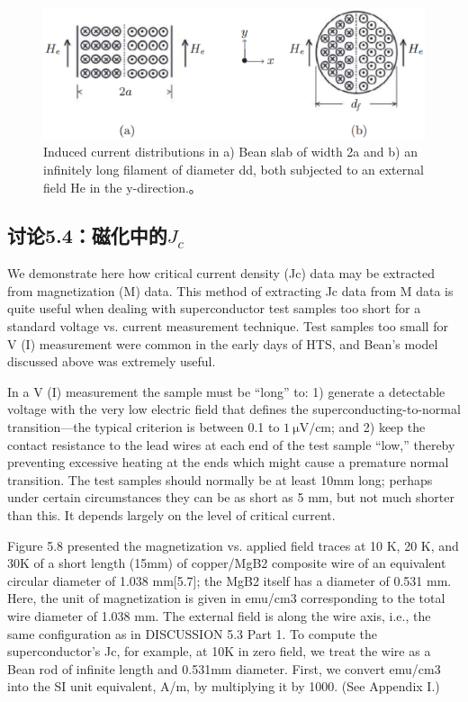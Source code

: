 \begin{figure}[htbp]
	\centering
	\includegraphics[scale=0.5]{chpt5/figs/fig5.16.eps}
	\caption{Induced current distributions in a) Bean slab of width 2a and b) an infinitely
		long filament of diameter dd, both subjected to an external field He in the y-direction.。}
\end{figure}

\subsection{讨论5.4：磁化中的$J_c$}
We demonstrate here how critical current density (Jc) data may be extracted
from magnetization (M) data. This method of extracting Jc data from M data
is quite useful when dealing with superconductor test samples too short for a
standard voltage vs. current measurement technique. Test samples too small for
V (I) measurement were common in the early days of HTS, and Bean’s model
discussed above was extremely useful.

In a V (I) measurement the sample must be “long” to: 1) generate a detectable
voltage with the very low electric field that defines the superconducting-to-normal
transition—the typical criterion is between 0.1 to $1\ \mathrm{\mu V/cm}$; and 2) keep the contact
resistance to the lead wires at each end of the test sample “low,” thereby preventing
excessive heating at the ends which might cause a premature normal transition.
The test samples should normally be at least 10mm long; perhaps under certain
circumstances they can be as short as 5 mm, but not much shorter than this. It
depends largely on the level of critical current.

Figure 5.8 presented the magnetization vs. applied field traces at 10 K, 20 K, and
30K of a short length (15mm) of copper/MgB2 composite wire of an equivalent
circular diameter of 1.038 mm[5.7]; the MgB2 itself has a diameter of 0.531 mm.
Here, the unit of magnetization is given in emu/cm3 corresponding to the total
wire diameter of 1.038 mm. The external field is along the wire axis, i.e., the same
configuration as in DISCUSSION 5.3 Part 1. To compute the superconductor’s Jc,
for example, at 10K in zero field, we treat the wire as a Bean rod of infinite length
and 0.531mm diameter. First, we convert emu/cm3 into the SI unit equivalent,
A/m, by multiplying it by 1000. (See Appendix I.)

